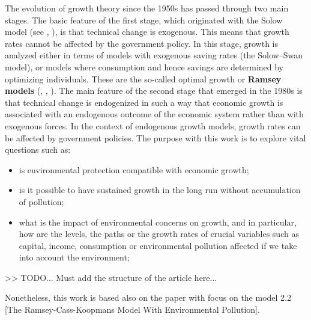 The evolution of growth theory since the 1950s has passed through two main stages. The basic feature of the first stage, which originated with the Solow model (see \cite[Solow]{solow_contribution_1956}, \cite[Swan]{swan_economic_1956}), is that technical change is exogenous. This means that growth rates cannot be affected by the government policy. In this stage, growth is analyzed either in terms of models with exogenous saving rates (the Solow–Swan model), or models where consumption and hence savings are determined by optimizing individuals. These are the so-called optimal growth or \textbf{Ramsey models} (\cite[Ramsey]{ramsey_mathematical_1928}, \cite[Cass]{cass_optimum_1965}, \cite[Koopmans]{koopmans_concept_1963}). The main feature of the second stage that emerged in the 1980s is that technical change is endogenized in such a way that economic growth is associated with an endogenous outcome of the economic system rather than with exogenous forces. In the context of endogenous growth models, growth rates can be affected by government policies. The purpose with this work is to explore vital questions such as: 
\begin{itemize}
	\item is environmental protection compatible with economic growth;
	\item is it possible to have sustained growth in the long run without accumulation of pollution;
	\item what is the impact of environmental concerns on growth, and in particular, how are the levels, the paths or the growth rates of crucial variables such as capital, income, consumption or environmental pollution affected if we take into account the environment;
\end{itemize}
>> TODO... 
Must add the structure of the article here...

Nonetheless, this work is based also on the paper \cite{caravaggio_nonlinear_2018} with focus on the model 2.2 [The Ramsey-Cass-Koopmans Model With Environmental Pollution]. 




